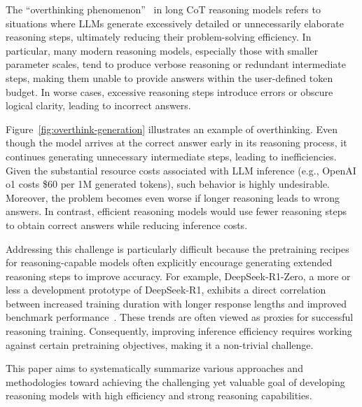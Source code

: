 The ``overthinking phenomenon''~\cite{team2025kimi,chen2024not} in long CoT reasoning models refers to situations where LLMs generate excessively detailed or unnecessarily elaborate reasoning steps, ultimately reducing their problem-solving efficiency. In particular, many modern reasoning models, especially those with smaller parameter scales, tend to produce verbose reasoning or redundant intermediate steps, making them unable to provide answers within the user-defined token budget. In worse cases, excessive reasoning steps introduce errors or obscure logical clarity, leading to incorrect answers.

Figure~\ref{fig:overthink-generation} illustrates an example of overthinking. Even though the model arrives at the correct answer early in its reasoning process, it continues generating unnecessary intermediate steps, leading to inefficiencies. Given the substantial resource costs associated with LLM inference (e.g., OpenAI o1 costs \$60 per 1M generated tokens), such behavior is highly undesirable. Moreover, the problem becomes even worse if longer reasoning leads to wrong answers. In contrast, efficient reasoning models would use fewer reasoning steps to obtain correct answers while reducing inference costs.

Addressing this challenge is particularly difficult because the pretraining recipes for reasoning-capable models often explicitly encourage generating extended reasoning steps to improve accuracy. For example, DeepSeek-R1-Zero, a more or less a development prototype of DeepSeek-R1, exhibits a direct correlation between increased training duration with longer response lengths and improved benchmark performance~\cite{guo2025deepseek}. These trends are often viewed as proxies for successful reasoning training. Consequently, improving inference efficiency requires working against certain pretraining objectives, making it a non-trivial challenge. 

This paper aims to systematically summarize various approaches and methodologies toward achieving the challenging yet valuable goal of developing reasoning models with high efficiency and strong reasoning capabilities.
